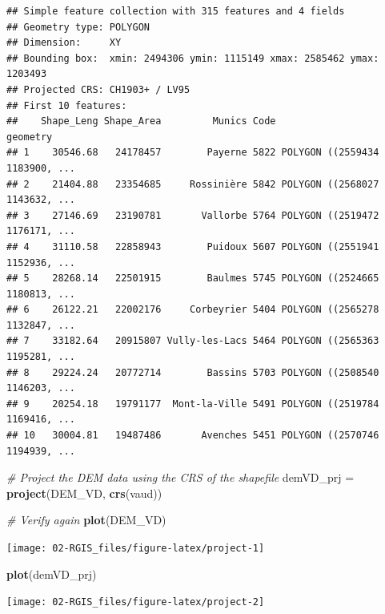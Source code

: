 \documentclass[
]{article}
\newenvironment{Shaded}{\begin{snugshade}}{\end{snugshade}}
\newcommand{\CommentTok}[1]{\textcolor[rgb]{0.56,0.35,0.01}{\textit{#1}}}
\newcommand{\FunctionTok}[1]{\textcolor[rgb]{0.13,0.29,0.53}{\textbf{#1}}}
\newcommand{\NormalTok}[1]{#1}
\newcommand{\OtherTok}[1]{\textcolor[rgb]{0.56,0.35,0.01}{#1}}
\begin{document}
\begin{verbatim}
## Simple feature collection with 315 features and 4 fields
## Geometry type: POLYGON
## Dimension:     XY
## Bounding box:  xmin: 2494306 ymin: 1115149 xmax: 2585462 ymax: 1203493
## Projected CRS: CH1903+ / LV95
## First 10 features:
##    Shape_Leng Shape_Area         Munics Code                       geometry
## 1    30546.68   24178457        Payerne 5822 POLYGON ((2559434 1183900, ...
## 2    21404.88   23354685     Rossinière 5842 POLYGON ((2568027 1143632, ...
## 3    27146.69   23190781       Vallorbe 5764 POLYGON ((2519472 1176171, ...
## 4    31110.58   22858943        Puidoux 5607 POLYGON ((2551941 1152936, ...
## 5    28268.14   22501915        Baulmes 5745 POLYGON ((2524665 1180813, ...
## 6    26122.21   22002176     Corbeyrier 5404 POLYGON ((2565278 1132847, ...
## 7    33182.64   20915807 Vully-les-Lacs 5464 POLYGON ((2565363 1195281, ...
## 8    29224.24   20772714        Bassins 5703 POLYGON ((2508540 1146203, ...
## 9    20254.18   19791177  Mont-la-Ville 5491 POLYGON ((2519784 1169416, ...
## 10   30004.81   19487486       Avenches 5451 POLYGON ((2570746 1194939, ...
\end{verbatim}

\begin{Shaded}
\begin{Highlighting}[]
\CommentTok{\# Project the DEM data using the CRS of the shapefile }
\NormalTok{demVD\_prj }\OtherTok{=} \FunctionTok{project}\NormalTok{(DEM\_VD, }\FunctionTok{crs}\NormalTok{(vaud))}

\CommentTok{\# Verify again}
\FunctionTok{plot}\NormalTok{(DEM\_VD)}
\end{Highlighting}
\end{Shaded}

\begin{center}\texttt{[image: 02-RGIS\_files/figure-latex/project-1]} \end{center}

\begin{Shaded}
\begin{Highlighting}[]
\FunctionTok{plot}\NormalTok{(demVD\_prj)}
\end{Highlighting}
\end{Shaded}

\begin{center}\texttt{[image: 02-RGIS\_files/figure-latex/project-2]} \end{center}
\end{document}
